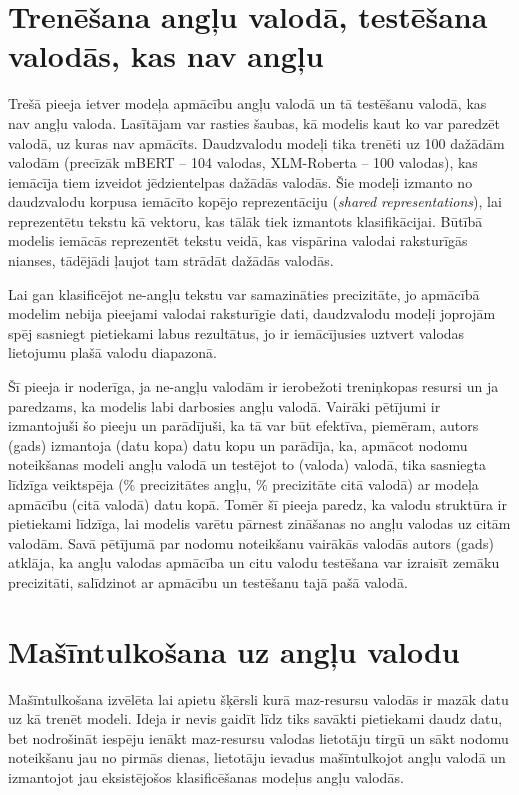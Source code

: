 \section{Trenēšana angļu valodā, testēšana valodās, kas nav angļu}

Trešā pieeja ietver modeļa apmācību angļu valodā un tā testēšanu valodā, kas nav angļu valoda. Lasītājam var rasties šaubas, kā modelis kaut ko var paredzēt valodā, uz kuras nav apmācīts. Daudzvalodu modeļi tika trenēti uz 100 dažādām valodām (precīzāk mBERT -- 104 valodas, XLM-Roberta -- 100 valodas), kas iemācīja tiem izveidot jēdzientelpas dažādās valodās. Šie modeļi izmanto no daudzvalodu korpusa iemācīto kopējo reprezentāciju (\textit{shared representations}), lai reprezentētu tekstu kā vektoru, kas tālāk tiek izmantots klasifikācijai. Būtībā modelis iemācās reprezentēt tekstu veidā, kas vispārina valodai raksturīgās nianses, tādējādi ļaujot tam strādāt dažādās valodās. 

Lai gan klasificējot ne-angļu tekstu var samazināties precizitāte, jo apmācībā modelim nebija pieejami valodai raksturīgie dati, daudzvalodu modeļi joprojām spēj sasniegt pietiekami labus rezultātus, jo ir iemācījusies uztvert valodas lietojumu plašā valodu diapazonā.

Šī pieeja ir noderīga, ja ne-angļu valodām ir ierobežoti treniņkopas resursi un ja paredzams, ka modelis labi darbosies angļu valodā. Vairāki pētījumi ir izmantojuši šo pieeju un parādījuši, ka tā var būt efektīva, piemēram, autors (gads) izmantoja (datu kopa) datu kopu un parādīja, ka, apmācot nodomu noteikšanas modeli angļu valodā un testējot to (valoda) valodā, tika sasniegta līdzīga veiktspēja (\% precizitātes angļu, \% precizitāte citā valodā) ar modeļa apmācību (citā valodā) datu kopā. Tomēr šī pieeja paredz, ka valodu struktūra ir pietiekami līdzīga, lai modelis varētu pārnest zināšanas no angļu valodas uz citām valodām. Savā pētījumā par nodomu noteikšanu vairākās valodās autors (gads) atklāja, ka angļu valodas apmācība un citu valodu testēšana var izraisīt zemāku precizitāti, salīdzinot ar apmācību un testēšanu tajā pašā valodā.


\section{Mašīntulkošana uz angļu valodu}


Mašīntulkošana izvēlēta lai apietu šķērsli kurā maz-resursu valodās ir mazāk datu uz kā trenēt modeli. Ideja ir nevis gaidīt līdz tiks savākti pietiekami daudz datu, bet nodrošināt iespēju ienākt maz-resursu valodas lietotāju tirgū un sākt nodomu noteikšanu jau no pirmās dienas, lietotāju ievadus mašīntulkojot angļu valodā un izmantojot jau eksistējošos klasificēšanas modeļus angļu valodās. 

